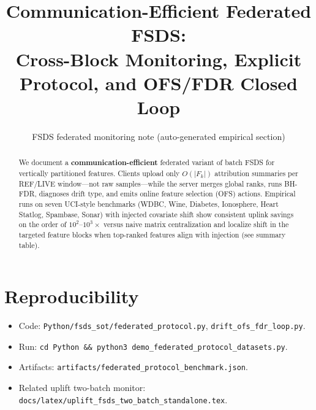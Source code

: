 \documentclass[11pt]{article}
\title{Communication-Efficient Federated FSDS:\\
Cross-Block Monitoring, Explicit Protocol, and OFS/FDR Closed Loop}
\author{FSDS federated monitoring note (auto-generated empirical section)}
\date{}
\begin{document}
\maketitle

\begin{abstract}
We document a \textbf{communication-efficient} federated variant of batch FSDS for vertically partitioned features.
Clients upload only $O(|F_k|)$ attribution summaries per REF/LIVE window---not raw samples---while the server merges global ranks, runs BH-FDR, diagnoses drift type, and emits online feature selection (OFS) actions.
Empirical runs on seven UCI-style benchmarks (WDBC, Wine, Diabetes, Ionosphere, Heart Statlog, Spambase, Sonar) with injected covariate shift show consistent uplink savings on the order of $10^2$--$10^3\times$ versus naive matrix centralization and localize shift in the targeted feature blocks when top-ranked features align with injection (see summary table).
\end{abstract}




\section{Reproducibility}
\begin{itemize}\itemsep2pt
  \item Code: \texttt{Python/fsds\_sot/federated\_protocol.py}, \texttt{drift\_ofs\_fdr\_loop.py}.
  \item Run: \texttt{cd Python \&\& python3 demo\_federated\_protocol\_datasets.py}.
  \item Artifacts: \texttt{artifacts/federated\_protocol\_benchmark.json}.
  \item Related uplift two-batch monitor: \texttt{docs/latex/uplift\_fsds\_two\_batch\_standalone.tex}.
\end{itemize}
\end{document}
